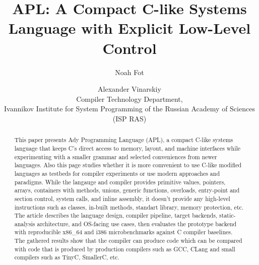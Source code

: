 \documentclass[10pt,twocolumn]{article}
\title{APL: A Compact C-like Systems Language with Explicit Low-Level Control}
\author{
  \normalsize Noah Fot \and \normalsize Alexander Vinarskiy \\
  \normalsize Compiler Technology Department, \\
  \normalsize Ivannikov Institute for System Programming of the Russian Academy of Sciences (ISP RAS)
}
\date{}
\begin{document}
\maketitle

\begin{abstract}
\par This paper presents Ady Programming Language (APL), a compact C-like systems language that keeps C's direct access to memory, layout, and machine interfaces while experimenting with a smaller grammar and selected conveniences from newer languages. Also this page studies whether it is more comvenient to use C-like modified languages as testbeds for compiler experiments or use modern approaches and paradigms. While the langauge and compiler provides primitive values, pointers, arrays, containers with methods, unions, generic functions, overloads, entry-point and section control, system calls, and inline assembly, it doesn't provide any high-level instructions such as classes, in-built methods, standart library, memory protection, etc. The article describes the language design, compiler pipeline, target backends, static-analysis architecture, and OS-facing use cases, then evaluates the prototype backend with reproducible x86\_64 and i386 microbenchmarks against C compiler baselines. The gathered results show that the compiler can produce code which can be compared with code that is produced by production compilers such as GCC, CLang and small compilers such as TinyC, SmallerC, etc.
\end{abstract}
\end{document}
